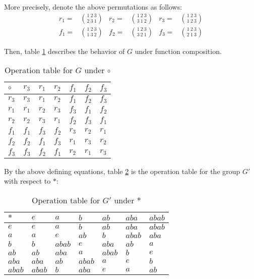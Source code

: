 \documentclass[12pt]{article}
\begin{document}
More precisely, denote the above permutations as follows:
\begin{align}
	\label{topperm}
	r_1 = & \binom{1\ 2\ 3}{2\ 3\ 1} &
	r_2 = & \binom{1\ 2\ 3}{3\ 1\ 2} &
	r_3 = & \binom{1\ 2\ 3}{1\ 2\ 3} \\
	\label{botperm}
	f_1 = & \binom{1\ 2\ 3}{1\ 3\ 2} &
	f_2 = & \binom{1\ 2\ 3}{3\ 2\ 1} &
	f_3 = & \binom{1\ 2\ 3}{2\ 1\ 3}
\end{align}


Then, table \ref{t1} describes the behavior of $G$ under function composition.

\begin{table}[!ht] 
\begin{tabular}{l|llllll}
	$\circ$ & $r_3$ & $r_1$ & $r_2$ & $f_1$ & $f_2$ & $f_3$	\\ \hline
	$r_3$ & $r_3$ & $r_1$ & $r_2$ & $f_1$ & $f_2$ & $f_3$   \\
	$r_1$ & $r_1$ & $r_2$ & $r_3$ & $f_3$ & $f_1$ & $f_2$ 	\\
	$r_2$ & $r_2$ & $r_3$ & $r_1$ & $f_2$ & $f_3$ & $f_1$ 	\\
	$f_1$ & $f_1$ & $f_3$ & $f_2$ & $r_3$ & $r_2$ & $r_1$ 	\\
	$f_2$ & $f_2$ & $f_1$ & $f_3$ & $r_1$ & $r_3$ & $r_2$ 	\\
	$f_3$ & $f_3$ & $f_2$ & $f_1$ & $r_2$ & $r_1$ & $r_3$	\\
\end{tabular}
\centering
\caption{Operation table for $G$ under $\circ$}
\label{t1}
\end{table}

By the above defining equations, table \ref{t2} is the operation table for
the group $G'$ with respect to $*$:

\begin{table}[!ht] 
\begin{tabular}{l|llllll}
	$*$ & $e$ & $a$ & $b$ & $ab$ & $aba$ & $abab$	\\ \hline
	$e$ & $e$ & $a$ & $b$ & $ab$ & $aba$ & $abab$    	\\
	$a$ & $a$ & $e$ & $ab$ & $b$ & $abab$ & $aba$ 		\\
	$b$ & $b$ & $abab$ & $e$ & $aba$ & $ab$ & $a$ 		\\
	$ab$ & $ab$ & $aba$ & $a$ & $abab$ & $b$ & $e$ 		\\
	$aba$ & $aba$ & $ab$ & $abab$ & $a$ & $e$ & $b$ 	\\
	$abab$ & $abab$ & $b$ & $aba$ & $e$ & $a$ & $ab$	\\
\end{tabular}
\centering
\caption{Operation table for $G'$ under $*$}
\label{t2}
\end{table}
\end{document}

